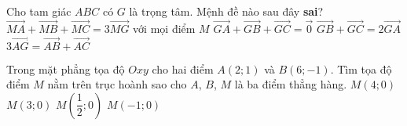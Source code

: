 \begin{ex}%
	Cho tam giác $ABC$ có $G$ là trọng tâm. Mệnh đề nào sau đây \textbf{sai}?
	\choice
	{$\vec{MA}+\vec{MB}+\vec{MC}=3\vec{MG}$ với mọi điểm $M$}
	{$\vec{GA}+\vec{GB}+\vec{GC}=\vec{0}$}
	{\True $\vec{GB}+\vec{GC}=2\vec{GA}$}
	{$3\vec{AG}=\vec{AB}+\vec{AC}$}
\end{ex}

\begin{ex}%
	Trong mặt phẳng tọa độ $Oxy$ cho hai điểm $A(2;1)$ và $B(6;-1)$. Tìm tọa độ điểm $M$ nằm trên trục hoành sao cho $A$, $B$, $M$ là ba điểm thẳng hàng.
	\choice
	{\True $M(4;0)$}
	{$M(3;0)$}
	{$M\left(\dfrac{1}{2};0\right)$}
	{$M(-1;0)$}
\end{ex}

